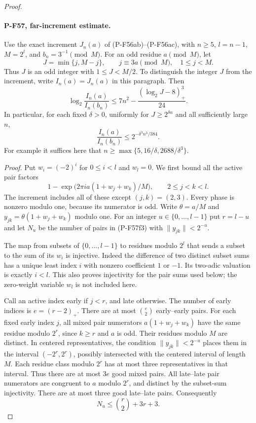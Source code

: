 \begin{proof}
\paragraph{P-F57, far-increment estimate.}
Use the exact increment $J_n(a)$ of (P-F56ab)--(P-F56ac),
with $n\ge5$, $l=n-1$, $M=2^l$, and $b_n=3^{-1}\pmod M$.
For an odd residue $a\pmod M$, let
\[
 J=\min\{j,M-j\},\qquad j\equiv3a\pmod M,
                 \quad 1\le j<M.
\]
Thus $J$ is an odd integer with $1\le J<M/2$.
To distinguish the integer $J$ from the increment, write
$I_n(a)=J_n(a)$ in this paragraph. Then
\[
 \log_2\frac{I_n(a)}{I_n(b_n)}
       \le 7n^2-\frac{(\log_2J-8)_+^3}{24}.
 \tag{P-F57f1}
\]
In particular, for each fixed $\delta>0$, uniformly for
$J\ge2^{\delta n}$ and all sufficiently large $n$,
\[
       \frac{I_n(a)}{I_n(b_n)}
                    \le2^{-\delta^3n^3/384}.
 \tag{P-F57f2}
\]
For example it suffices here that
$n\ge\max\{5,16/\delta,2688/\delta^3\}$.

\emph{Proof.}
Put $w_i=(-2)^i$ for $0\le i<l$ and $w_l=0$.
We first bound all the active pair factors
\[
       1-\exp\bigl(2\pi i a(1+w_j+w_k)/M\bigr),
                 \qquad 2\le j<k<l.
 \tag{P-F57f3}
\]
The increment includes all of these except $(j,k)=(2,3)$.
Every phase is nonzero modulo one, because its numerator
is odd. Write $\theta=a/M$ and
$y_{jk}=\theta(1+w_j+w_k)$ modulo one.
For an integer $u\in\{0,\ldots,l-1\}$ put
$r=l-u$ and let $N_u$ be the number of pairs in (P-F57f3)
with $\|y_{jk}\|<2^{-u}$.

The map from subsets of $\{0,\ldots,l-1\}$ to residues
modulo $2^l$ that sends a subset to the sum of its $w_i$
is injective. Indeed the difference of two distinct subset
sums has a unique least index $i$ with nonzero coefficient
$1$ or $-1$. Its two-adic valuation is exactly $i<l$.
This also proves injectivity for the pair sums used below;
the zero-weight variable $w_l$ is not included here.

Call an active index early if $j<r$, and late otherwise.
The number of early indices is $e=(r-2)_+$.
There are at most $\binom e2$ early--early pairs.
For each fixed early index $j$, all mixed pair numerators
$a(1+w_j+w_k)$ have the same residue modulo $2^r$,
since $k\ge r$ and $a$ is odd. Their residues modulo $M$
are distinct. In centered representatives, the condition
$\|y_{jk}\|<2^{-u}$ places them in the interval
$(-2^r,2^r)$, possibly intersected with the centered
interval of length $M$. Each residue class modulo $2^r$
has at most three representatives in that interval.
Thus there are at most $3e$ good mixed pairs.
All late--late pair numerators are congruent to $a$
modulo $2^r$, and distinct by the subset-sum injectivity.
There are at most three good late--late pairs. Consequently
\[
             N_u\le\binom r2+3r+3.
 \tag{P-F57f4}
\]


\end{proof}
